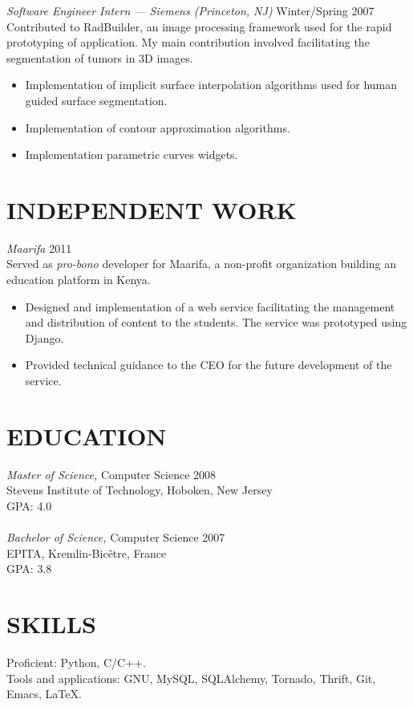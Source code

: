 \documentclass[line,margin]{res}
\begin{document}
\begin{resume}
                {\sl Software Engineer Intern --- Siemens (Princeton, NJ)} \hfill Winter/Spring 2007 \\
                Contributed to RadBuilder, an image processing framework used for the rapid prototyping of application. My main contribution involved facilitating the segmentation of tumors in 3D images.
                \begin{itemize}  \itemsep -2pt
                    \item Implementation of implicit surface interpolation algorithms used for human guided surface segmentation.
                    \item Implementation of contour approximation algorithms.
                    \item Implementation parametric curves widgets.
                \end{itemize}

\section{INDEPENDENT WORK}
                {\sl Maarifa} \hfill 2011 \\
                Served as \textit{pro-bono} developer for Maarifa, a non-profit organization building an education platform in Kenya.
                \begin{itemize}  \itemsep -2pt
                    \item Designed and implementation of a web service facilitating the management and distribution of content to the students. The service was prototyped using Django.
                    \item Provided technical guidance to the CEO for the future development of the service.
                \end{itemize}

\section{EDUCATION} 
                {\sl Master of Science,} Computer Science \hfill 2008 \\
                Stevens Institute of Technology, Hoboken, New Jersey \\
                GPA: 4.0 \\
                \vspace{1pt} \\
                {\sl Bachelor of Science,} Computer Science \hfill 2007 \\
                EPITA, Kremlin-Bic\^etre, France \\
                GPA: 3.8 \\

\section{SKILLS}
                Proficient: Python, C/C++. \\
                Tools and applications: GNU, MySQL, SQLAlchemy, Tornado, Thrift, Git, Emacs, \LaTeX. \\

\end{resume}
\end{document}
